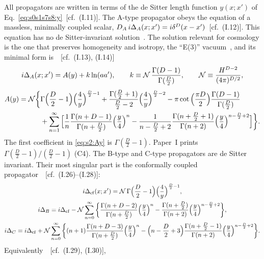 \documentclass[aps,prd,onecolumn,10pt,nofootinbib,floatfix]{revtex4-2}
\newcommand{\PI}{Paper~I}
\newcommand{\eqI}[1]{(I.#1)}
\begin{document}
All propagators are written in terms of the de Sitter length
function $y(x;x')$ of Eq.~\eqref{eq:s0s1s7s8:y}~[cf.\ \eqI{11}]. The A-type propagator obeys the equation of a massless, minimally coupled
scalar, $D_A\,i\Delta_A(x;x')=i\delta^D(x-x')$~[cf.\ \eqI{12}]. This equation has
no de Sitter-invariant solution~\cite{ref:Allen1987}. The solution relevant
for cosmology is the one that preserves homogeneity and isotropy, the
``E(3)'' vacuum~\cite{ref:Allen1985}, and its minimal form
is~\cite{ref:Onemli2002,ref:Onemli2004}~[cf.\ \eqI{13}, \eqI{14}]
\begin{equation}
i\Delta_A(x;x')=A(y)+k\ln(aa'),\qquad k\equiv\mathcal N\,\frac{\Gamma(D-1)}{\Gamma(\frac D2)},\qquad
\mathcal N\equiv\frac{H^{D-2}}{(4\pi)^{D/2}},
\label{eq:s2:DA}
\end{equation}
\begin{equation}
\begin{aligned}
A(y)=\mathcal N\bigg\{&\Gamma\Big(\frac D2-1\Big)\Big(\frac4y\Big)^{\frac D2-1}
+\frac{\Gamma(\frac D2+1)}{\frac D2-2}\Big(\frac4y\Big)^{\frac D2-2}
-\pi\cot\Big(\frac{\pi D}{2}\Big)\frac{\Gamma(D-1)}{\Gamma(\frac D2)}\\
&+\sum_{n=1}^\infty\Big[\frac1n\frac{\Gamma(n+D-1)}{\Gamma(n+\frac D2)}\Big(\frac y4\Big)^n
-\frac{1}{n-\frac D2+2}\frac{\Gamma(n+\frac D2+1)}{\Gamma(n+2)}\Big(\frac y4\Big)^{n-\frac D2+2}\Big]\bigg\}.
\end{aligned}
\label{eq:s2:Ay}
\end{equation}
The first coefficient in \eqref{eq:s2:Ay} is $\Gamma(\tfrac D2-1)$.
\PI{} prints $\Gamma(\tfrac D2-1)/(\tfrac D2-1)$ (C4). The B-type and C-type
propagators are de Sitter invariant. Their most singular part is the
conformally coupled propagator~\cite{ref:Birrell1982}~[cf.\
\eqI{26}--\eqI{28}]:
\begin{gather}
i\Delta_{\rm cf}(x;x')=\mathcal N\,\Gamma\Big(\frac D2-1\Big)\Big(\frac4y\Big)^{\frac D2-1},
\label{eq:s2:Dcf}\\
i\Delta_B=i\Delta_{\rm cf}-\mathcal N\sum_{n=0}^\infty\bigg\{\frac{\Gamma(n+D-2)}{\Gamma(n+\frac D2)}\Big(\frac y4\Big)^n
-\frac{\Gamma(n+\frac D2)}{\Gamma(n+2)}\Big(\frac y4\Big)^{n-\frac D2+2}\bigg\},
\label{eq:s2:DB}\\
i\Delta_C=i\Delta_{\rm cf}+\mathcal N\sum_{n=0}^\infty\bigg\{(n+1)\frac{\Gamma(n+D-3)}{\Gamma(n+\frac D2)}\Big(\frac y4\Big)^n
-\Big(n-\frac D2+3\Big)\frac{\Gamma(n+\frac D2-1)}{\Gamma(n+2)}\Big(\frac y4\Big)^{n-\frac D2+2}\bigg\}.
\label{eq:s2:DC}
\end{gather}
Equivalently~\cite{ref:Candelas1975,ref:Dowker1976}~[cf.\ \eqI{29}, \eqI{30}],
\end{document}
